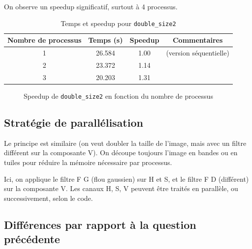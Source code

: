 \documentclass[a4paper,13pt]{book}
\begin{document}
On observe un speedup significatif, surtout à 4 processus.
\begin{table}[h!]
    \centering
    \caption{Temps et speedup pour \texttt{double\_size2}}
    \label{tab:double\_size2}
    \begin{tabular}{@{}cccc@{}}
    \toprule
    \textbf{Nombre de processus} & \textbf{Temps (s)} & \textbf{Speedup} & \textbf{Commentaires}\\
    \midrule
    1 & 26.584 & 1.00 & (version séquentielle)\\
    2 & 23.372 & 1.14 & \\
    3 & 20.203 & 1.31 & \\
    \bottomrule
    \end{tabular}
    \end{table}
    
    \begin{figure}[h!]
    \centering
    \caption{Speedup de \texttt{double\_size2} en fonction du nombre de processus}
    \label{fig:double\_size2_speedup}
    \end{figure}
    \subsection{Stratégie de parallélisation}

    Le principe est similaire (on veut doubler la taille de l’image, mais avec un filtre différent sur la composante V). On découpe toujours l’image en bandes ou en tuiles pour réduire la mémoire nécessaire par processus.
    
        Ici, on applique le filtre F G (flou gaussien) sur H et S, et le filtre F D (différent) sur la composante V.
        Les canaux H, S, V peuvent être traités en parallèle, ou successivement, selon le code.
    
    \subsection{Différences par rapport à la question précédente}
    
\end{document}
